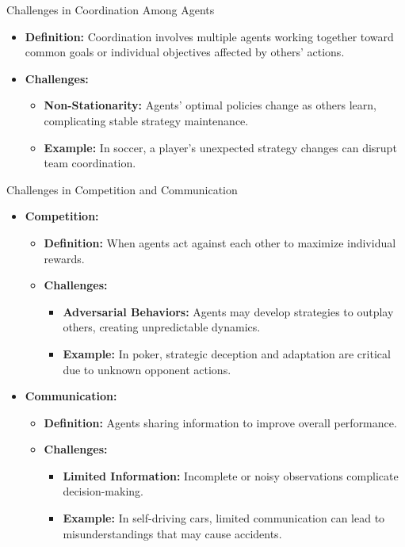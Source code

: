 \documentclass[aspectratio=169]{beamer}
\begin{document}
\begin{frame}[fragile]{Challenges in Coordination Among Agents}
    \begin{itemize}
        \item \textbf{Definition:} Coordination involves multiple agents working together toward common goals or individual objectives affected by others' actions.
        \item \textbf{Challenges:}
            \begin{itemize}
                \item \textbf{Non-Stationarity:} Agents' optimal policies change as others learn, complicating stable strategy maintenance.
                \item \textbf{Example:} In soccer, a player's unexpected strategy changes can disrupt team coordination.
            \end{itemize}
    \end{itemize}
\end{frame}

\begin{frame}[fragile]{Challenges in Competition and Communication}
    \begin{itemize}
        \item \textbf{Competition:}
            \begin{itemize}
                \item \textbf{Definition:} When agents act against each other to maximize individual rewards.
                \item \textbf{Challenges:}
                    \begin{itemize}
                        \item \textbf{Adversarial Behaviors:} Agents may develop strategies to outplay others, creating unpredictable dynamics.
                        \item \textbf{Example:} In poker, strategic deception and adaptation are critical due to unknown opponent actions.
                    \end{itemize}
            \end{itemize}
        \item \textbf{Communication:}
            \begin{itemize}
                \item \textbf{Definition:} Agents sharing information to improve overall performance.
                \item \textbf{Challenges:}
                    \begin{itemize}
                        \item \textbf{Limited Information:} Incomplete or noisy observations complicate decision-making.
                        \item \textbf{Example:} In self-driving cars, limited communication can lead to misunderstandings that may cause accidents.
                    \end{itemize}
            \end{itemize}
    \end{itemize}
\end{frame}
\end{document}
